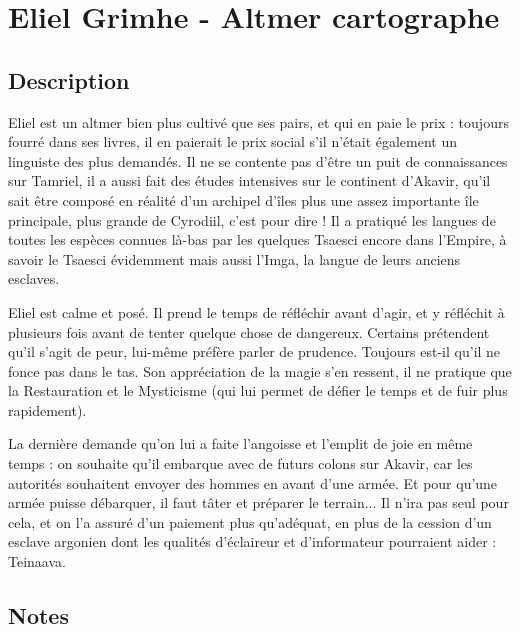 \documentclass{Tamriel}
\begin{document}
\chapter*{Eliel Grimhe - Altmer cartographe}

\begin{multicols*}{2}
\raggedcolumns

        \section*{Description}

        Eliel est un altmer bien plus cultivé que ses pairs, et qui en paie le prix : toujours fourré dans ses livres, il en paierait le prix social s'il n'était également un linguiste des plus demandés. Il ne se contente pas d'être un puit de connaissances sur Tamriel, il a aussi fait des études intensives sur le continent d'Akavir, qu'il sait être composé en réalité d'un archipel d'îles plus une assez importante île principale, plus grande de Cyrodiil, c'est pour dire ! Il a pratiqué les langues de toutes les espèces connues là-bas par les quelques Tsaesci encore dans l'Empire, à savoir le Tsaesci évidemment mais aussi l'Imga, la langue de leurs anciens esclaves. 
        
        Eliel est calme et posé. Il prend le temps de réfléchir avant d'agir, et y réfléchit à plusieurs fois avant de tenter quelque chose de dangereux. Certains prétendent qu'il s'agit de peur, lui-même préfère parler de prudence. Toujours est-il qu'il ne fonce pas dans le tas. Son appréciation de la magie s'en ressent, il ne pratique que la Restauration et le Mysticisme (qui lui permet de défier le temps et de fuir plus rapidement).
        
        La dernière demande qu'on lui a faite l'angoisse et l'emplit de joie en même temps : on souhaite qu'il embarque avec de futurs colons sur Akavir, car les autorités souhaitent envoyer des hommes en avant d'une armée. Et pour qu'une armée puisse débarquer, il faut tâter et préparer le terrain... Il n'ira pas seul pour cela, et on l'a assuré d'un paiement plus qu'adéquat, en plus de la cession d'un esclave argonien dont les qualités d'éclaireur et d'informateur pourraient aider : Teinaava.
        
        \columnbreak

        \section*{Notes}
        
\end{multicols*}
\end{document}

